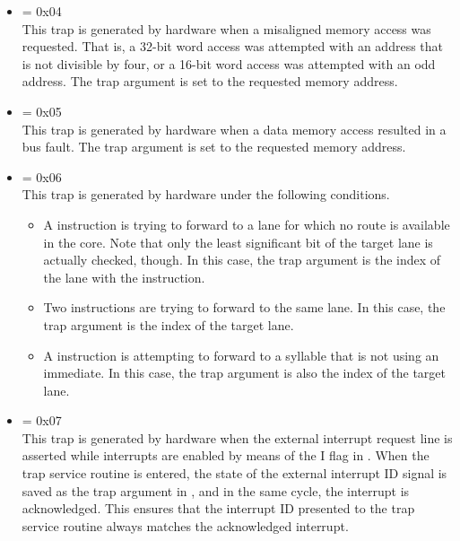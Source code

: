 \begin{itemize}
\setcounter{enumi}{3}
\item {} \label{trap:MISALIGNED_ACCESS}  = 0x04
\\[6 pt]
This trap is generated by hardware when a misaligned memory access was
requested. That is, a 32-bit word access was attempted with an address that is
not divisible by four, or a 16-bit word access was attempted with an odd
address. The trap argument is set to the requested memory address.

\setcounter{enumi}{4}
\item {} \label{trap:DMEM_FAULT}  = 0x05
\\[6 pt]
This trap is generated by hardware when a data memory access resulted in a bus
fault. The trap argument is set to the requested memory address.

\setcounter{enumi}{5}
\item {} \label{trap:LIMMH_FAULT}  = 0x06
\\[6 pt]
This trap is generated by hardware under the following conditions.

\begin{itemize}

\item A  instruction is trying to forward to a lane for which no
route is available in the core. Note that only the least significant bit of the
target lane is actually checked, though. In this case, the trap argument is the
index of the lane with the  instruction.

\item Two  instructions are trying to forward to the same lane. In
this case, the trap argument is the index of the target lane.

\item A  instruction is attempting to forward to a syllable that
is not using an immediate. In this case, the trap argument is also the index of
the target lane.

\end{itemize}

\setcounter{enumi}{6}
\item {} \label{trap:EXT_INTERRUPT}  = 0x07
\\[6 pt]
This trap is generated by hardware when the external interrupt request line is
asserted while interrupts are enabled by means of the I flag in . When
the trap service routine is entered, the state of the external interrupt ID
signal is saved as the trap argument in , and in the same cycle, the
interrupt is acknowledged. This ensures that the interrupt ID presented to the
trap service routine always matches the acknowledged interrupt.


\end{itemize}
